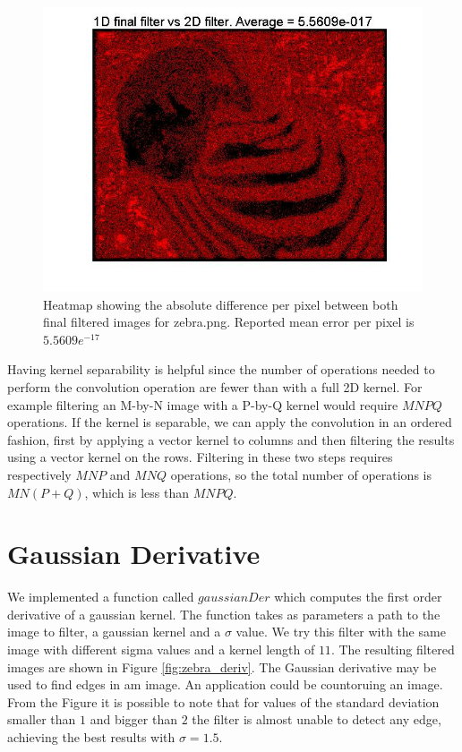 \documentclass[11pt]{article}
\begin{document}
\begin{figure}[H] \centering
	\includegraphics[width=.9\textwidth]{imgs/zebra_heatmap.jpg}
	\caption{Heatmap showing the absolute difference per pixel between both
		final filtered images for zebra.png. Reported mean error per pixel is
		$5.5609 e^{-17}$}
	\label{fig:zebra_heatmap}
\end{figure}

Having kernel separability is helpful since the number of operations needed to
perform the convolution operation are fewer than with a full 2D kernel. For
example filtering an M-by-N image with a P-by-Q kernel would require $MNPQ$
operations. If the kernel is separable, we can apply the convolution in an
ordered fashion, first by applying a vector kernel to columns and then filtering
the results using a vector kernel on the rows. Filtering in these two steps
requires respectively $MNP$ and $MNQ$ operations, so the total number of
operations is $MN(P + Q)$, which is less than $MNPQ$.

\section{Gaussian Derivative}
We implemented a function called $gaussianDer$ which computes the first order
derivative of a gaussian kernel. The function takes as parameters a path to the
image to filter, a gaussian kernel and a $\sigma$ value. We try this filter with
the same image with different sigma values and a kernel length of $11$. The
resulting filtered images are shown in Figure \ref{fig:zebra_deriv}.  The
Gaussian derivative may be used to find edges in am image. An application could
be countoruing an image. From the Figure it is possible to note that for values
of the standard deviation smaller than $1$ and bigger than $2$ the filter is
almost unable to detect any edge, achieving the best results with $\sigma=1.5$.
\end{document}
